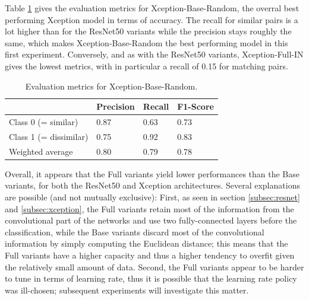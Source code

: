\documentclass[11pt]{report}
\begin{document}
Table \ref{tab:tabxcepprel1} gives the evaluation metrics for Xception-Base-Random, the overral best performing Xception model in terms of accuracy. The recall for similar pairs is a lot higher than for the ResNet50 variants while the precision stays roughly the same, which makes Xception-Base-Random the best performing model in this first experiment. Conversely, and as with the ResNet50 variants, Xception-Full-IN gives the lowest metrics, with in particular a recall of 0.15 for matching pairs.

\begin{table}[h!]
\begin{tabular}{l|l|l|l|}
\cline{2-4}
                                             & Precision & Recall & F1-Score \\ \hline
\multicolumn{1}{|l|}{Class 0 (= similar)}    & 0.87      & 0.63   & 0.73     \\ \cline{1-1}
\multicolumn{1}{|l|}{Class 1 (= dissimilar)} & 0.75      & 0.92   & 0.83     \\ \hline
\multicolumn{1}{|l|}{Weighted average}       & 0.80      & 0.79   & 0.78     \\ \hline
\end{tabular}
\caption{Evaluation metrics for Xception-Base-Random.}
\label{tab:tabxcepprel1}
\end{table}

Overall, it appears that the Full variants yield lower performances than the Base variants, for both the ResNet50 and Xception architectures. Several explanations are possible (and not mutually exclusive):\newline
First, as seen in section \ref{subsec:resnet} and \ref{subsec:xception}, the Full variants retain most of the information from the convolutional part of the networks and use two fully-connected layers before the classification, while the Base variants discard most of the convolutional information by simply computing the Euclidean distance; this means that the Full variants have a higher capacity and thus a higher tendency to overfit given the relatively small amount of data.\newline
Second, the Full variants appear to be harder to tune in terms of learning rate, thus it is possible that the learning rate policy was ill-chosen; subsequent experiments will investigate this matter.\newline

\newpage
\end{document}
